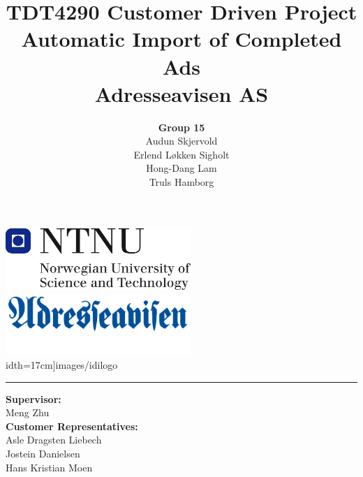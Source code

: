 \documentclass[12pt, a4paper]{article}
\title{\normalsize TDT4290 Customer Driven Project \\ \LARGE \textbf{Automatic Import of Completed Ads} \normalsize \\Adresseavisen AS}
\author{\Large \textbf{Group 15} \normalsize\\Audun Skjervold \\ Erlend Løkken Sigholt \\ Hong-Dang Lam \\ Truls Hamborg}
\begin{document}
\maketitle \hspace{-0.5cm}
\includegraphics[width=7cm]{images/ntnulogo} \hspace{0.5cm}
\includegraphics[width=7cm]{images/adressalogo1}\\idth=17cm]{images/idilogo}\\\hrule

\begin{center}
\textbf{Supervisor:}\\ Meng Zhu\\
\textbf{Customer Representatives:}\\ Asle Dragsten Liebech \\
Jostein Danielsen\\
Hans Kristian Moen\\
\end{center}
\thispagestyle{empty}
\newpage




\tableofcontents
\newpage

\listoffigures
\newpage

\listoftables
\newpage












\end{document}
